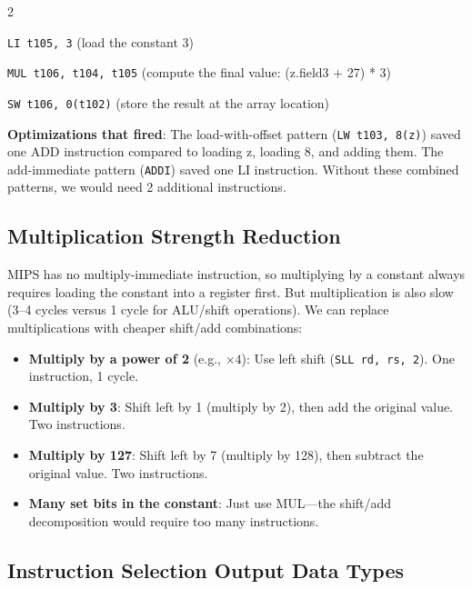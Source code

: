 \documentclass[9pt,landscape]{extarticle}
\begin{document}
\begin{multicols}{2}
\begin{exambox}[{Worked Example: Instruction Selection for a[i] = (z.field3 + 27) * 3}]
\texttt{LI t105, 3} \quad\quad\quad (load the constant 3)

\texttt{MUL t106, t104, t105} \quad (compute the final value: (z.field3 + 27) * 3)

\texttt{SW t106, 0(t102)} \quad\quad (store the result at the array location)

\textbf{Optimizations that fired}: The load-with-offset pattern (\texttt{LW t103, 8(z)}) saved one ADD instruction compared to loading z, loading 8, and adding them. The add-immediate pattern (\texttt{ADDI}) saved one LI instruction. Without these combined patterns, we would need 2 additional instructions.
\end{exambox}

\subsection{Multiplication Strength Reduction}

MIPS has no multiply-immediate instruction, so multiplying by a constant always requires loading the constant into a register first. But multiplication is also slow (3--4 cycles versus 1 cycle for ALU/shift operations). We can replace multiplications with cheaper shift/add combinations:

\begin{itemize}
  \item \textbf{Multiply by a power of 2} (e.g., $\times 4$): Use left shift (\texttt{SLL rd, rs, 2}). One instruction, 1 cycle.
  \item \textbf{Multiply by 3}: Shift left by 1 (multiply by 2), then add the original value. Two instructions.
  \item \textbf{Multiply by 127}: Shift left by 7 (multiply by 128), then subtract the original value. Two instructions.
  \item \textbf{Many set bits in the constant}: Just use MUL---the shift/add decomposition would require too many instructions.
\end{itemize}

\subsection{Instruction Selection Output Data Types}


\end{multicols}
\end{document}
